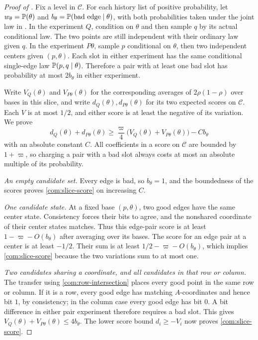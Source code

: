 \begin{proof}[Proof of ]
Fix a level in $\mathcal C$. For each history list of positive probability, let
\(w_\theta=\mathbb P(\theta)\) and
\(b_\theta=\mathbb P(\text{bad edge}\mid\theta)\), with both probabilities taken
under the joint law in . In the experiment $Q$,
condition on \(\theta\) and then sample \(q\) by its actual conditional law.
The two points are still independent with their ordinary law given \(q\).
In the experiment $P\theta$, sample \(p\) conditional on
\(\theta\), then two independent centers given \((p,\theta)\). Each slot
in either experiment has the same conditional single-edge law
\(\mathbb P(p,q\mid\theta)\). Therefore a pair with at least one bad slot has
probability at most \(2b_\theta\) in either experiment.

Write \(V_Q(\theta)\) and \(V_{P\theta}(\theta)\) for the corresponding
averages of \(2\rho(1-\rho)\) over bases in this slice, and write
\(d_Q(\theta),d_{P\theta}(\theta)\) for its two expected scores on $\mathcal C$. Each \(V\) is at most \(1/2\), and either score is at least the
negative of its variation. We prove
\begin{equation}\label{com:slice-score}
 d_Q(\theta)+d_{P\theta}(\theta)
 \ge\frac\varpi4\bigl(V_Q(\theta)+V_{P\theta}(\theta)\bigr)
       -C b_\theta
\end{equation}
with an absolute constant \(C\). All coefficients in a score on $\mathcal C$ are
bounded by \(1+\varpi\), so charging a pair with a bad slot always costs
at most an absolute multiple of its probability.

\emph{An empty candidate set.}
Every edge is bad, so \(b_\theta=1\), and the boundedness of the scores proves
\eqref{com:slice-score} on increasing \(C\).

\emph{One candidate state.}
At a fixed base $(p,\theta)$, two good edges have the same center state.
Consistency forces their bits to agree, and the nonshared coordinate of
their center states matches. Thus this edge-pair score is at least
\(1-\varpi-O(b_\theta)\) after averaging over its bases. The score for an edge pair at a center is at least \(-1/2\). Their sum is at least
\(1/2-\varpi-O(b_\theta)\), which implies \eqref{com:slice-score} because
the two variations sum to at most one.

\emph{Two candidates sharing a coordinate, and all candidates in that row
or column.}
The transfer using \eqref{com:row-intersection} places every good point in
the same row or column. If it is a row, every good edge has matching
\(A\)-coordinates and hence bit \(1\), by consistency; in the column case
every good edge has bit \(0\). A bit difference in either pair experiment
therefore requires a bad slot. This gives
\(V_Q(\theta)+V_{P\theta}(\theta)\le4b_\theta\). The lower score bound
\(d_i\ge-V_i\) now proves \eqref{com:slice-score}.


\end{proof}
